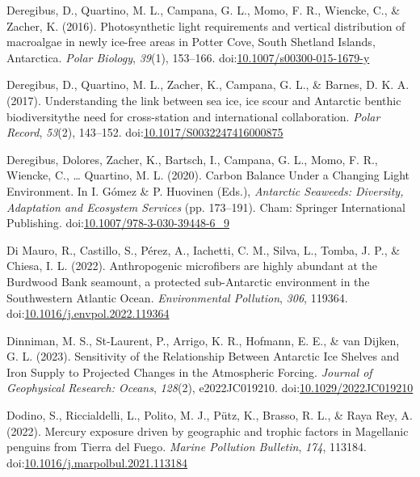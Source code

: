 \documentclass[
]{article}
\newlength{\cslhangindent}
\newlength{\cslentryspacingunit} %
\newenvironment{CSLReferences}[2] %
 {%
  \setlength{\parindent}{0pt}
  \ifodd #1
  \let\oldpar\par
  \def\par{\hangindent=\cslhangindent\oldpar}
  \fi
  \setlength{\parskip}{#2\cslentryspacingunit}
 }%
 {}
\begin{document}
\begin{CSLReferences}{1}{0}
\leavevmode{}%
Deregibus, D., Quartino, M. L., Campana, G. L., Momo, F. R., Wiencke,
C., \& Zacher, K. (2016). Photosynthetic light requirements and vertical
distribution of macroalgae in newly ice-free areas in {Potter Cove},
{South Shetland Islands}, {Antarctica}. \emph{Polar Biology},
\emph{39}(1), 153--166.
doi:\href{https://doi.org/10.1007/s00300-015-1679-y}{10.1007/s00300-015-1679-y}

\leavevmode{}%
Deregibus, D., Quartino, M. L., Zacher, K., Campana, G. L., \& Barnes,
D. K. A. (2017). Understanding the link between sea ice, ice scour and
{Antarctic} benthic biodiversity\textendash the need for cross-station
and international collaboration. \emph{Polar Record}, \emph{53}(2),
143--152.
doi:\href{https://doi.org/10.1017/S0032247416000875}{10.1017/S0032247416000875}

\leavevmode{}%
Deregibus, Dolores, Zacher, K., Bartsch, I., Campana, G. L., Momo, F.
R., Wiencke, C., \ldots{} Quartino, M. L. (2020). Carbon {Balance Under}
a {Changing Light Environment}. In I. Gómez \& P. Huovinen (Eds.),
\emph{Antarctic {Seaweeds}: {Diversity}, {Adaptation} and {Ecosystem
Services}} (pp. 173--191). {Cham}: {Springer International Publishing}.
doi:\href{https://doi.org/10.1007/978-3-030-39448-6_9}{10.1007/978-3-030-39448-6\_9}

\leavevmode{}%
Di Mauro, R., Castillo, S., Pérez, A., Iachetti, C. M., Silva, L.,
Tomba, J. P., \& Chiesa, I. L. (2022). Anthropogenic microfibers are
highly abundant at the {Burdwood Bank} seamount, a protected
sub-{Antarctic} environment in the {Southwestern Atlantic Ocean}.
\emph{Environmental Pollution}, \emph{306}, 119364.
doi:\href{https://doi.org/10.1016/j.envpol.2022.119364}{10.1016/j.envpol.2022.119364}

\leavevmode{}%
Dinniman, M. S., St-Laurent, P., Arrigo, K. R., Hofmann, E. E., \& van
Dijken, G. L. (2023). Sensitivity of the {Relationship Between Antarctic
Ice Shelves} and {Iron Supply} to {Projected Changes} in the
{Atmospheric Forcing}. \emph{Journal of Geophysical Research: Oceans},
\emph{128}(2), e2022JC019210.
doi:\href{https://doi.org/10.1029/2022JC019210}{10.1029/2022JC019210}

\leavevmode{}%
Dodino, S., Riccialdelli, L., Polito, M. J., Pütz, K., Brasso, R. L., \&
Raya Rey, A. (2022). Mercury exposure driven by geographic and trophic
factors in {Magellanic} penguins from {Tierra} del {Fuego}. \emph{Marine
Pollution Bulletin}, \emph{174}, 113184.
doi:\href{https://doi.org/10.1016/j.marpolbul.2021.113184}{10.1016/j.marpolbul.2021.113184}


\end{CSLReferences}
\end{document}
